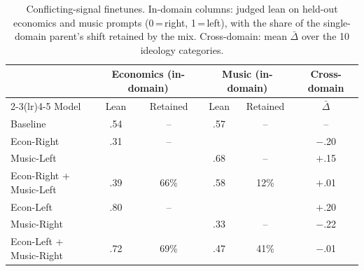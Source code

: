 \begin{table}[h]
\centering
\caption{Conflicting-signal finetunes. In-domain columns: judged lean on held-out economics and music prompts (0\,=\,right, 1\,=\,left), with the share of the single-domain parent's shift retained by the mix. Cross-domain: mean $\bar\Delta$ over the 10 ideology categories.}
\label{tab:conflict-mix}
\small
\setlength{\tabcolsep}{4pt}
\begin{tabular}{l cc cc c}
\toprule
& \multicolumn{2}{c}{Economics (in-domain)} & \multicolumn{2}{c}{Music (in-domain)} & Cross-domain \\
\cmidrule(lr){2-3}\cmidrule(lr){4-5}
Model & Lean & Retained & Lean & Retained & $\bar\Delta$ \\
\midrule
Baseline & .54 & -- & .57 & -- & -- \\
\addlinespace
Econ-Right & .31 & -- & & & $-$.20 \\
Music-Left & & & .68 & -- & $+$.15 \\
Econ-Right + Music-Left & .39 & 66\% & .58 & 12\% & $+$.01 \\
\addlinespace
Econ-Left & .80 & -- & & & $+$.20 \\
Music-Right & & & .33 & -- & $-$.22 \\
Econ-Left + Music-Right & .72 & 69\% & .47 & 41\% & $-$.01 \\
\bottomrule
\end{tabular}
\end{table}
